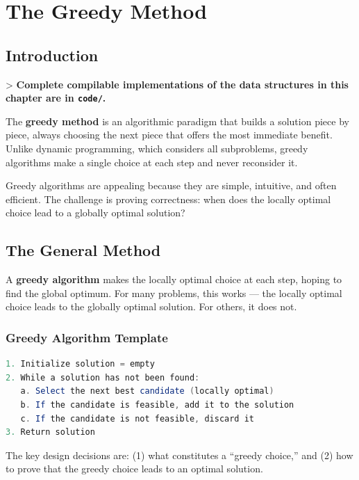 \chapter{The Greedy Method}\label{ch15:the-greedy-method}

\section{Introduction}

> \textbf{Complete compilable implementations of the data structures in this chapter are in \texttt{code/}.}

The \textbf{greedy method} is an algorithmic paradigm that builds a solution piece by piece, always choosing the next piece that offers the most immediate benefit. Unlike dynamic programming, which considers all subproblems, greedy algorithms make a single choice at each step and never reconsider it.

Greedy algorithms are appealing because they are simple, intuitive, and often efficient. The challenge is proving correctness: when does the locally optimal choice lead to a globally optimal solution?

\section{The General Method}

A \textbf{greedy algorithm} makes the locally optimal choice at each step, hoping to find the global optimum. For many problems, this works — the locally optimal choice leads to the globally optimal solution. For others, it does not.

\subsection{Greedy Algorithm Template}

\begin{lstlisting}[language=Java]
1. Initialize solution = empty
2. While a solution has not been found:
   a. Select the next best candidate (locally optimal)
   b. If the candidate is feasible, add it to the solution
   c. If the candidate is not feasible, discard it
3. Return solution
\end{lstlisting}

The key design decisions are: (1) what constitutes a ``greedy choice,'' and (2) how to prove that the greedy choice leads to an optimal solution.

